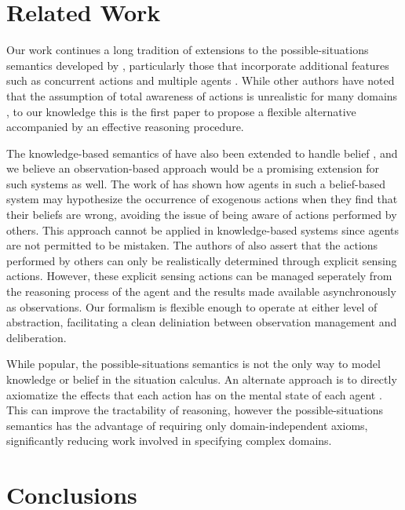 \documentclass{ifaamas-submission}
\begin{document}
\section{Related Work}

\label{sec:Related-Work}Our work continues a long tradition of extensions
to the possible-situations semantics developed by \cite{scherl03sc_knowledge},
particularly those that incorporate additional features such as concurrent
actions \cite{scherl03conc_knowledge} and multiple agents \cite{shapiro01casl_feat_inter}.
While other authors have noted that the assumption of total awareness
of actions is unrealistic for many domains \cite{Lesperance99sitcalc_approach,shapiro04sc_belief_exog},
to our knowledge this is the first paper to propose a flexible alternative
accompanied by an effective reasoning procedure.

The knowledge-based semantics of \cite{scherl03sc_knowledge} have
also been extended to handle belief \cite{shapiro00sc_belief}, and
we believe an observation-based approach would be a promising extension
for such systems as well. The work of \cite{shapiro04sc_belief_exog}
has shown how agents in such a belief-based system may hypothesize
the occurrence of exogenous actions when they find that their beliefs
are wrong, avoiding the issue of being aware of actions performed
by others. This approach cannot be applied in knowledge-based systems
since agents are not permitted to be mistaken. The authors of \cite{shapiro04sc_belief_exog}
also assert that the actions performed by others can only be realistically
determined through explicit sensing actions. However, these explicit
sensing actions can be managed seperately from the reasoning process
of the agent and the results made available asynchronously as observations.
Our formalism is flexible enough to operate at either level of abstraction,
facilitating a clean deliniation between observation management and
deliberation. 

While popular, the possible-situations semantics is not the only way
to model knowledge or belief in the situation calculus. An alternate
approach is to directly axiomatize the effects that each action has
on the mental state of each agent \cite{demolombe00tractable_sc_belief}.
This can improve the tractability of reasoning, however the possible-situations
semantics has the advantage of requiring only domain-independent axioms,
significantly reducing work involved in specifying complex domains.


\section{Conclusions}
\end{document}
